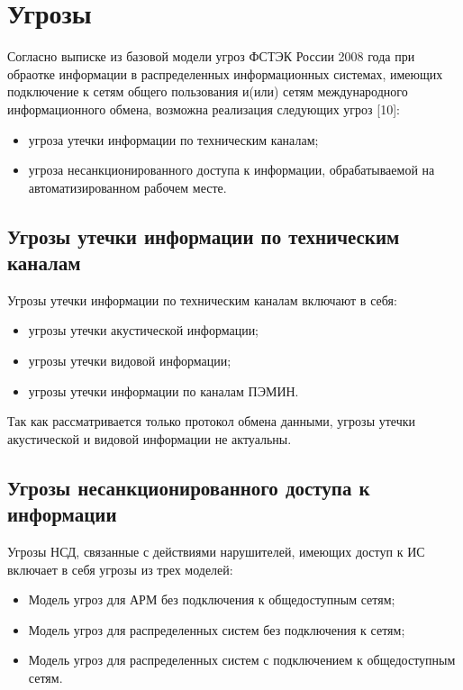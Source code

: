 \newpage
\section{Угрозы}
\setcounter{figure}{0}

Согласно выписке из базовой модели угроз ФСТЭК России 2008 года при обраотке информации в распределенных информационных системах, имеющих подключение к сетям общего пользования и(или) сетям международного информационного обмена, возможна реализация следующих угроз [10]:

\begin{itemize}
 \item угроза утечки информации по техническим каналам;
 \item угроза несанкционированного доступа к информации, обрабатываемой на автоматизированном рабочем месте.
\end{itemize}

\subsection{Угрозы утечки информации по техническим каналам}

Угрозы утечки информации по техническим каналам включают в себя:

\begin{itemize}
 \item угрозы утечки акустической информации;
 \item угрозы утечки видовой информации;
 \item угрозы утечки информации по каналам ПЭМИН.
\end{itemize}

Так как рассматривается только протокол обмена данными, угрозы утечки акустической и видовой информации не актуальны.

\subsection{Угрозы несанкционированного доступа к информации}

Угрозы НСД, связанные с действиями нарушителей, имеющих доступ к ИС включает в себя угрозы из трех моделей:

\begin{itemize}
 \item Модель угроз для АРМ без подключения к общедоступным сетям;
 \item Модель угроз для распределенных систем без подключения к сетям;
 \item Модель угроз для распределенных систем с подключением к общедоступным сетям.
\end{itemize}

